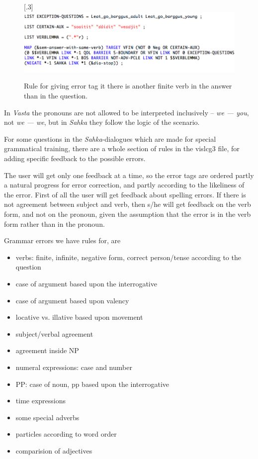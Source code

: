 \documentclass[11pt]{article}
\begin{document}
\begin{figure}[htbp]
\begin{center}
\scalebox{.3}[.3]{\includegraphics{presentation/img/verblemma.png}}\\
\caption{Rule for giving error tag it there is another finite verb in the answer than in the question.}
\label{sameverb}
\end{center}
\end{figure}


In \textit{Vasta} the pronouns are not allowed to be interpreted inclusively -- \textit{we — you}, not \textit{we — we}, but in \textit{Sahka} they follow the logic of the scenario.

For some questions in the \textit{Sahka}-dialogues which are made for special grammatical training, there are a whole section of rules in the vislcg3 file, for adding specific feedback to the possible errors.

The user will get only one feedback at a time, so the error tags are ordered partly a natural progress for error correction, and partly according to the likeliness of the error. First of all the user will get feedback about spelling errors. If there is not agreement between subject and verb, then s/he will get feedback on the verb form, and not on the pronoun, given the assumption that the error is in the verb form rather than in the pronoun.

Grammar errors we have rules for, are
\begin{itemize}
\setlength{\itemsep}{-0.2cm}
\item verbs: finite, infinite, negative form, correct person/tense according to the question
\item case of argument based upon the interrogative 
\item case of argument based upon valency
\item locative vs. illative based upon movement
\item subject/verbal agreement
\item agreement inside NP 
\item numeral expressions: case and number 
\item PP: case of noun, pp based upon the interrogative 
\item time expressions 
\item some special adverbs 
\item particles according to word order
\item comparision of adjectives
\end{itemize}
\end{document}
